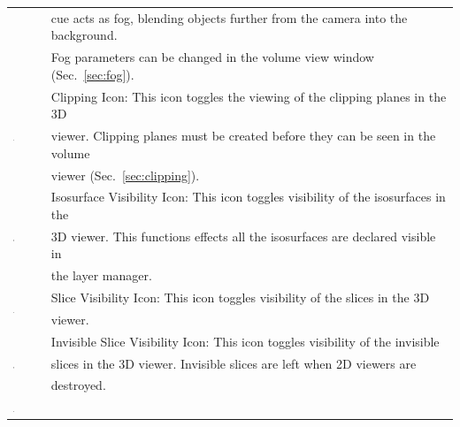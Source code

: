 \documentclass[fleqn,11pt,openany]{book}
\begin{document}
\begin{table}[h!]
\begin{tabular}{|l|l|}
& cue acts as fog, blending objects further from the camera into the background.\\
& Fog parameters can be changed in the volume view window (Sec.~\ref{sec:fog}).\\
\hline
\multirow{3}{*}{ \includegraphics[width=0.05\textwidth]{Seg3DBasicFunctionality_figures/ClipOff.png} }
& Clipping Icon: This icon toggles the viewing of the clipping planes in the 3D\\
& viewer.  Clipping planes must be created before they can be seen in the volume\\
& viewer (Sec.~\ref{sec:clipping}).\\
\hline
\multirow{3}{*}{ \includegraphics[width=0.05\textwidth]{Seg3DBasicFunctionality_figures/IsosurfaceVisibleOff.png} }
& Isosurface Visibility Icon: This icon toggles visibility of the isosurfaces in the\\
& 3D viewer.  This functions effects all the isosurfaces are declared visible in\\
& the layer manager.\\
\hline
\multirow{2}{*}{ \includegraphics[width=0.05\textwidth]{Seg3DBasicFunctionality_figures/SlicesVisibleOff.png} }
& Slice Visibility Icon: This icon toggles visibility of the slices in the 3D \\
& viewer.\\
\hline
\multirow{3}{*}{ \includegraphics[width=0.05\textwidth]{Seg3DBasicFunctionality_figures/InvisibleSlicesVisibleOff.png} }
& Invisible Slice Visibility Icon: This icon toggles visibility of the invisible\\
& slices in the 3D viewer.  Invisible slices are left when 2D viewers are \\
& destroyed.\\
\hline
\multirow{3}{*}{ \includegraphics[width=0.05\textwidth]{Seg3DBasicFunctionality_figures/VolumeRenderingOff.png} }

\end{tabular}
\end{table}
\end{document}
